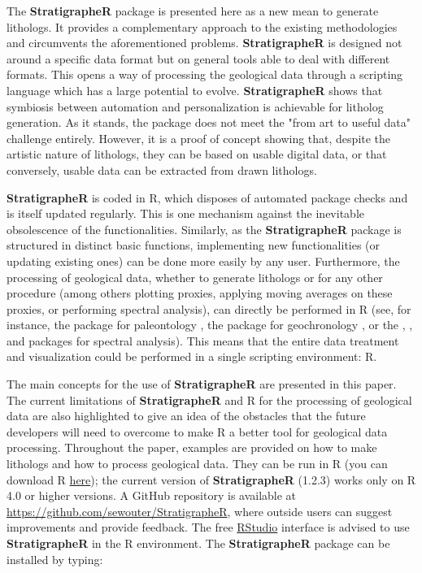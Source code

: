 The \textbf{StratigrapheR} package is presented here as a new mean to generate lithologs. It provides a complementary approach to the existing methodologies and circumvents the aforementioned problems. \textbf{StratigrapheR} is designed not around a specific data format but on general tools able to deal with different formats. This opens a way of processing the geological data through a scripting language which has a large potential to evolve. \textbf{StratigrapheR} shows that symbiosis between automation and personalization is achievable for litholog generation. As it stands, the package does not meet the "from art to useful data" challenge entirely. However, it is a proof of concept showing that, despite the artistic nature of lithologs, they can be based on usable digital data, or that conversely, usable data can be extracted from drawn lithologs. 

\textbf{StratigrapheR} is coded in R, which disposes of automated package checks \citep{wickham_r_2015} and is itself updated regularly. This is one mechanism against the inevitable obsolescence of the functionalities. Similarly, as the \textbf{StratigrapheR} package is structured in distinct basic functions, implementing  new functionalities (or updating existing ones) can be done more easily by any user. Furthermore, the processing of geological data, whether to generate lithologs or for any other procedure (among others plotting proxies, applying moving averages on these proxies, or performing spectral analysis), can directly be performed in R (see, for instance, the  package for paleontology \citep{bapst_paleotree_2012}, the  package for geochronology \citep{vermeesch_isoplotr_2018}, or the  \citep{bowman_hilberthuang_2013},  \citep{meyers_astrochron_2014},  \citep{gouhier_r_2019} and  \citep{wouters_decomposer_2020} packages for spectral analysis). This means that the entire data treatment and visualization could be performed in a single scripting environment: R.

The main concepts for the use of \textbf{StratigrapheR} are presented in this paper. The current limitations of \textbf{StratigrapheR} and R for the processing of geological data are also highlighted to give an idea of the obstacles that the future developers will need to overcome to make R a better tool for geological data processing. Throughout the paper, examples are provided on how to make lithologs and how to process geological data. They can be run in R (you can download R \href{https://www.r-project.org/}{here}); the current version of \textbf{StratigrapheR} (1.2.3) works only on R 4.0 or higher versions. A GitHub repository is available at \href{https://github.com/sewouter/StratigrapheR}{https://github.com/sewouter/StratigrapheR}, where outside users can suggest improvements and provide feedback. The free \href{https://rstudio.com/products/rstudio/#rstudio-desktop}{RStudio} interface is advised to use \textbf{StratigrapheR} in the R environment. The \textbf{StratigrapheR} package can be installed by typing:

